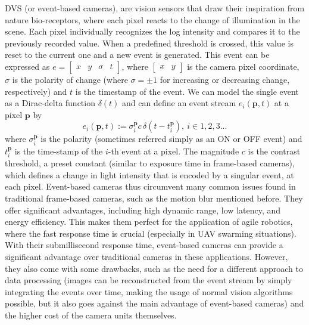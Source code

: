 \ac{DVS} (or event-based cameras), are vision sensors that draw their inspiration from nature bio-receptors, where each pixel reacts
to the change of illumination in the scene. Each pixel individually recognizes the log intensity and compares it to the previously
recorded value. When a predefined threshold is crossed, this value is reset to the current one and a new event is generated. This event can be expressed as $e = \begin{bmatrix} x & y & \sigma & t \end{bmatrix}$, where $\begin{bmatrix} x & y \end{bmatrix}$
is the camera pixel coordinate, $\sigma$ is the polarity of change (where $\sigma = \pm 1$ for increasing or decreasing change, respectively) and $t$ is the timestamp of the event. \cite{gallego22event} \cite{scheerlinck2018event} We can model the single event as a Dirac-delta function $\delta(t)$ and can define an event stream
$e_i(\boldsymbol{p}, t)$ at a pixel $\boldsymbol{p}$ by  \cite{scheerlinck2018event}
\begin{equation}
e_i(\boldsymbol{p}, t) := \sigma_i^{\boldsymbol{p}} c \, \delta(t - t_i^{\boldsymbol{p}}), \ i \in 1, 2, 3 ...
\label{eq:event_eq}
\end{equation}
where $\sigma_i^{\boldsymbol{p}}$ is the polarity (sometimes referred simply as an ON or OFF event) and $t_i^{\boldsymbol{p}}$ is the time-stamp of the $i$-th event at a pixel.
The magnitude $c$ is the contrast threshold, a preset constant (similar to exposure time in frame-based cameras), which defines a change in light intensity that is encoded by a singular event, at each pixel. Event-based cameras thus circumvent many common issues found in traditional frame-based cameras, such as the motion blur mentioned before. They offer significant advantages, including high dynamic range, low latency,
and energy efficiency.
This makes them perfect for the application of agile robotics,
where the fast response time is crucial (especially in UAV swarming situations). With their submillisecond response time,
event-based cameras can provide a significant advantage over traditional cameras in these applications.
However, they also come with some drawbacks, such as the need for a different approach to
data processing (images can be reconstructed from the event stream by simply integrating the events over time,
making the usage of normal vision algorithms possible, but it also goes against the main advantage of event-based cameras)
and the higher cost of the camera units themselves. \cite{gallego22event}


